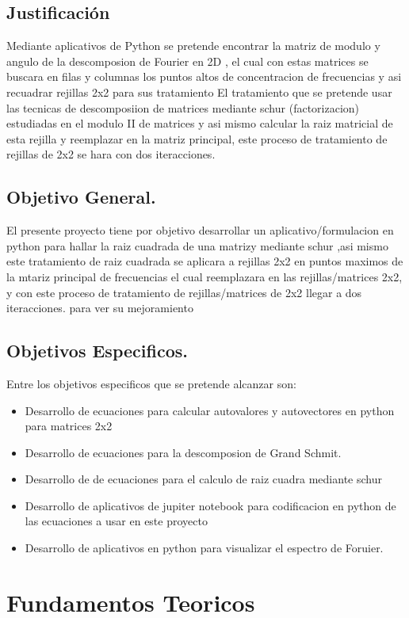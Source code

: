 \documentclass[Spanish,12pt,doublespace,german,letterpaper,dvipdfm]{article}
\begin{document}
\subsection{Justificaci\'on}
Mediante aplicativos de Python se pretende   encontrar  la matriz de modulo y angulo de la descomposion de Fourier en 2D , el cual con estas matrices se buscara en filas y columnas los puntos altos de concentracion de frecuencias y asi recuadrar rejillas 2x2 para sus tratamiento  
El tratamiento que se pretende usar las tecnicas de descomposiion de matrices  mediante schur (factorizacion)  estudiadas en el modulo II de matrices y asi mismo calcular la raiz matricial de esta rejilla y reemplazar en la matriz principal, este proceso de tratamiento de rejillas de 2x2 se hara con dos iteracciones.
\subsection{Objetivo General.}
El presente proyecto  tiene por objetivo desarrollar un aplicativo/formulacion  en python para hallar la raiz cuadrada  de una matrizy mediante schur ,asi mismo este tratamiento de raiz cuadrada se aplicara  a rejillas 2x2 en puntos maximos de la mtariz principal de frecuencias  el cual reemplazara en las rejillas/matrices 2x2, y con  este proceso de tratamiento de rejillas/matrices de 2x2 llegar a  dos iteracciones. para ver su mejoramiento

\subsection{Objetivos Especificos.}
Entre los objetivos especificos que se pretende alcanzar son:
\begin{itemize}
  \item Desarrollo de ecuaciones para calcular autovalores y autovectores en python para matrices 2x2 
  \item Desarrollo de ecuaciones para la descomposion de Grand Schmit.
  \item Desarrollo de de ecuaciones   para el calculo de raiz cuadra mediante schur
  \item Desarrollo de aplicativos de jupiter notebook para codificacion en  python de las ecuaciones a usar en este proyecto
  \item Desarrollo de aplicativos en python para visualizar el espectro de Foruier.
 \end{itemize}
 
\section{Fundamentos Teoricos}
\end{document}
